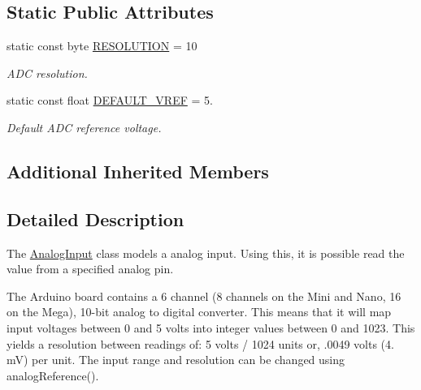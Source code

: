 \subsection*{Static Public Attributes}
\begin{DoxyCompactItemize}
\item 
\hypertarget{classsmrtobj_1_1io_1_1_analog_input_af12741094c2f05dfdb9598bac6c78e6c}{}static const byte \hyperlink{classsmrtobj_1_1io_1_1_analog_input_af12741094c2f05dfdb9598bac6c78e6c}{R\+E\+S\+O\+L\+U\+T\+I\+O\+N} = 10\label{classsmrtobj_1_1io_1_1_analog_input_af12741094c2f05dfdb9598bac6c78e6c}

\begin{DoxyCompactList}\small\item\em A\+D\+C resolution. \end{DoxyCompactList}\item 
\hypertarget{classsmrtobj_1_1io_1_1_analog_input_a170725a849e4b1676d739c7c7b96ee71}{}static const float \hyperlink{classsmrtobj_1_1io_1_1_analog_input_a170725a849e4b1676d739c7c7b96ee71}{D\+E\+F\+A\+U\+L\+T\+\_\+\+V\+R\+E\+F} = 5.\label{classsmrtobj_1_1io_1_1_analog_input_a170725a849e4b1676d739c7c7b96ee71}

\begin{DoxyCompactList}\small\item\em Default A\+D\+C reference voltage. \end{DoxyCompactList}\end{DoxyCompactItemize}
\subsection*{Additional Inherited Members}


\subsection{Detailed Description}
The \hyperlink{classsmrtobj_1_1io_1_1_analog_input}{Analog\+Input} class models a analog input. Using this, it is possible read the value from a specified analog pin.

The Arduino board contains a 6 channel (8 channels on the Mini and Nano, 16 on the Mega), 10-\/bit analog to digital converter. This means that it will map input voltages between 0 and 5 volts into integer values between 0 and 1023. This yields a resolution between readings of\+: 5 volts / 1024 units or, .0049 volts (4. m\+V) per unit. The input range and resolution can be changed using analog\+Reference().

